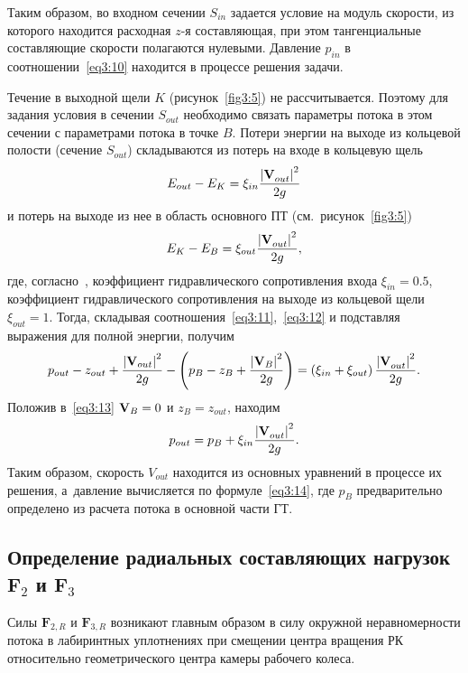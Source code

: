 Таким образом, во входном сечении $S_{in}$ задается условие на модуль скорости, из которого находится 
расходная $z$-я составляющая, при этом тангенциальные составляющие скорости полагаются нулевыми. 
Давление $p_{in}$ в соотношении~\eqref{eq3:10} находится в процессе решения задачи.

Течение в выходной щели $K$ (рисунок~\ref{fig3:5}) не рассчитывается. Поэтому для задания
условия в сечении $S_{out}$ необходимо связать параметры потока в этом сечении с параметрами потока 
в точке $B$. Потери энергии на выходе из кольцевой полости (сечение $S_{out}$) складываются из
потерь на входе в кольцевую щель
\begin{equation}
  E_{out} -E_K =\xi _{in} \frac{{\left| {{\bf{V}}_{out}^{}} \right|^2 }}{{2g}}
  \label{eq3:11}
\end{equation}
и потерь на выходе из нее в область основного ПТ (см.~рисунок~\ref{fig3:5})
\begin{equation}
  E_K  -E_B  = \xi _{out} \frac{{\left| {{\bf{V}}_{out}^{} } \right|^2 }}{{2g}},
  \label{eq3:12}
\end{equation}
где, согласно~\cite{idelchik}, коэффициент гидравлического сопротивления входа $\xi_{in}=0.5$, коэффициент 
гидравлического сопротивления на выходе из кольцевой щели $\xi_{out}=1$. Тогда,
складывая соотношения~\eqref{eq3:11},~\eqref{eq3:12} и подставляя выражения для полной энергии, получим
\begin{equation}
  p_{out} -z_{out} +\frac{{\left| {{\bf{V}}_{out} }\right|^2 }}{{2g}} -\left( {p_B - z_B +\frac{{\left|{{\bf{V}}_B }\right|^2}}{{2g}}}\right) =
  \left( {\xi _{in} + \xi _{out}}\right)\frac{{\left| {{\bf{V}}_{out}^{}}\right|^2 }}{{2g}}.
  \label{eq3:13}
\end{equation}
Положив в~\eqref{eq3:13} ${\bf{V}}_B = 0$ и $z_B=z_{out}$, находим
\begin{equation}
  p_{out} = p_B + \xi _{in}\frac{{\left| {{\bf{V}}_{out}^{}}\right|^2 }}{{2g}}.
  \label{eq3:14}
\end{equation}
Таким образом, скорость $V_{out}$ находится из основных уравнений в процессе их решения, а~давление 
вычисляется по формуле~\eqref{eq3:14}, где $p_B$ предварительно определено из расчета потока 
в основной части ГТ.

\subsection{Определение радиальных составляющих нагрузок $\textbf{F}_2$ и $\textbf{F}_3$}
\label{s:343}
Силы $\textbf{F}_{2,R}$ и $\textbf{F}_{3,R}$ возникают главным образом в силу окружной
неравномерности потока в лабиринтных уплотнениях при смещении центра вращения РК относительно 
геометрического центра камеры рабочего колеса.

